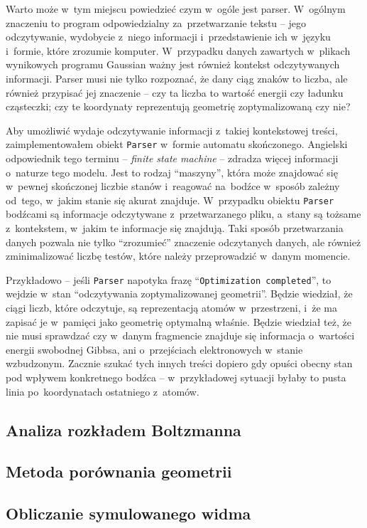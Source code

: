Warto może w~tym miejscu powiedzieć czym w~ogóle jest parser.
W~ogólnym znaczeniu to program odpowiedzialny za~przetwarzanie tekstu
  \--- jego odczytywanie, wydobycie z~niego informacji i~przedstawienie ich w~języku i~formie,
  które zrozumie komputer.
W~przypadku danych zawartych w~plikach wynikowych programu Gaussian ważny jest również kontekst
  odczytywanych informacji.
Parser musi nie tylko rozpoznać, że dany ciąg znaków to liczba, ale również przypisać jej znaczenie
  \--- czy ta liczba to wartość energii czy ładunku cząsteczki; czy te koordynaty reprezentują
  geometrię zoptymalizowaną czy nie?

Aby umożliwić wydaje odczytywanie informacji z~takiej kontekstowej treści, zaimplementowałem
  obiekt \texttt{Parser} w~formie automatu skończonego.
Angielski odpowiednik tego terminu \--- \textit{finite state machine} \--- zdradza więcej
  informacji o~naturze tego modelu.
Jest to rodzaj \enquote{maszyny}, która może znajdować się w~pewnej skończonej liczbie stanów
  i~reagować na~bodźce w~sposób zależny od~tego, w~jakim stanie się akurat znajduje.
W~przypadku obiektu \texttt{Parser} bodźcami są informacje odczytywane z~przetwarzanego pliku,
  a~stany są tożsame z~kontekstem, w~jakim te informacje się znajdują.
Taki sposób przetwarzania danych pozwala nie tylko \enquote{zrozumieć} znaczenie odczytanych
  danych, ale również zminimalizować liczbę testów, które należy przeprowadzić w~danym momencie.

Przykładowo \--- jeśli \texttt{Parser} napotyka frazę \enquote{\texttt{Optimization completed}},
  to wejdzie w~stan \enquote{odczytywania zoptymalizowanej geometrii}.
Będzie wiedział, że ciągi liczb, które odczytuje, są reprezentacją atomów w~przestrzeni,
  i~że ma zapisać je w~pamięci jako geometrię optymalną właśnie.
Będzie wiedział też, że nie musi sprawdzać czy w~danym fragmencie znajduje się informacja
  o~wartości energii swobodnej Gibbsa, ani o~przejściach elektronowych w~stanie wzbudzonym.
Zacznie szukać tych innych treści dopiero gdy opuści obecny stan pod wpływem konkretnego bodźca
  \--- w~przykładowej sytuacji byłaby to pusta linia po~koordynatach ostatniego z~atomów.

\subsection{Analiza rozkładem Boltzmanna}\label{implementation:boltzmann}
\subsection{Metoda porównania geometrii}\label{implementation:rmsd}
\subsection{Obliczanie symulowanego widma}\label{implementation:spectra}
